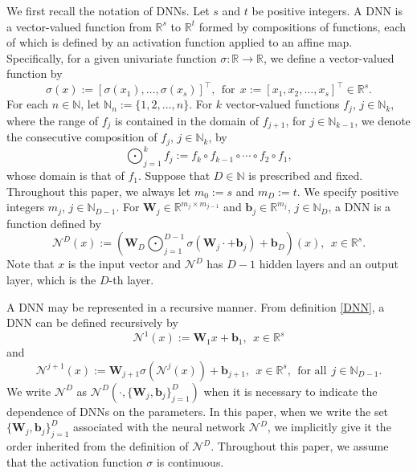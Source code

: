 \documentclass[11pt]{article}
\begin{document}
We first recall the notation of DNNs.
Let $s$ and $t$ be positive integers. A DNN is a vector-valued function from $\mathbb{R}^s$ to $\mathbb{R}^t$ formed by compositions of functions, each of which is defined by an activation function applied to an affine map. Specifically, for a given univariate function $\sigma: \mathbb{R}\to\mathbb{R}$,
we define a vector-valued function  by 
\begin{equation*}\label{activationF}
\sigma({x}):=[\sigma(x_1),\dots,\sigma(x_s)]^\top, \ \ \mbox{for}\ \ {x}:=[x_1, x_2,\dots, x_s]^\top\in\mathbb{R}^s.
\end{equation*}
For each $n\in\mathbb{N}$, let $\mathbb{N}_n:=\{1,2,\ldots,n\}$. For $k$ vector-valued functions $f_j$, $j\in\mathbb{N}_k$, where the range of $f_j$ is contained in the domain of $f_{j+1}$, for $j\in\mathbb{N}_{k-1}$, we denote the consecutive composition of $f_j$, $j\in\mathbb{N}_k$, by
\begin{equation*}\label{consecutive_composition}
    \bigodot_{j=1}^k f_j:=f_k\circ f_{k-1}\circ\cdots\circ f_2\circ f_1,
\end{equation*}
whose domain is that of $f_1$. 
Suppose that $D\in \mathbb{N}$ is prescribed and fixed. Throughout this paper, we always let $m_0:=s$ and $m_D:=t$. We specify  positive integers $m_j$, $j\in \mathbb{N}_{D-1}$.
For $\mathbf{W}_j\in\mathbb{R}^{m_j\times m_{j-1}}$ and $\mathbf{b}_j\in\mathbb{R}^{m_j}$, $j\in\mathbb{N}_D$, 
a DNN is a function defined by
\begin{equation}\label{DNN}
\mathcal{N}^D({x}):=\left(\mathbf{W}_D\bigodot_{j=1}^{D-1} \sigma(\mathbf{W}_j \cdot+\mathbf{b}_j)+\mathbf{b}_D\right)({x}),\ \ {x}\in\mathbb{R}^s.
\end{equation}
Note that $x$ is the input vector and $\mathcal{N}^D$ has $D-1$ hidden layers and an output layer, which is the $D$-th layer.
%

A DNN may be represented in a recursive manner.
From definition \eqref{DNN}, a DNN can be defined recursively by
\begin{equation*}\label{Step1}
    \mathcal{N}^1({x}):=\mathbf{W}_1 {x}+\mathbf{b}_1, \ \ {x}\in \mathbb{R}^s
\end{equation*}
and
\begin{equation*}\label{Recursion}
    \mathcal{N}^{j+1}({x}):=\mathbf{W}_{j+1}\sigma(\mathcal{N}^j({x}))+\mathbf{b}_{j+1}, \ \ {x}\in \mathbb{R}^s, \ \ \mbox{for all} \ \ j\in \mathbb{N}_{D-1}.
\end{equation*}
We write $\mathcal{N}^D$ as $\mathcal{N}^D(\cdot,\{\mathbf{W}_j,\mathbf{b}_j\}_{j=1}^D)$ when it is necessary to indicate the dependence of DNNs on the parameters. In this paper, when we write the set $\{\mathbf{W}_j,\mathbf{b}_j\}_{j=1}^D$ associated with the neural network $\mathcal{N}^D$, we implicitly give it the order inherited from the definition of $\mathcal{N}^D$. Throughout this paper, we assume that the activation function $\sigma$ is continuous.
\end{document}
